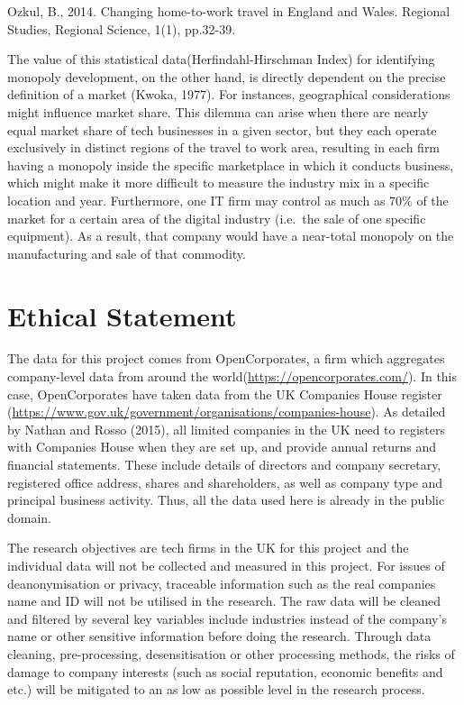 \documentclass[
  12pt,
  oneside]{book}
\begin{document}
Ozkul, B., 2014. Changing home-to-work travel in England and Wales. Regional Studies, Regional Science, 1(1), pp.32-39.

The value of this statistical data(Herfindahl-Hirschman Index) for identifying monopoly development, on the other hand, is directly dependent on the precise definition of a market (Kwoka, 1977). For instances, geographical considerations might influence market share. This dilemma can arise when there are nearly equal market share of tech businesses in a given sector, but they each operate exclusively in distinct regions of the travel to work area, resulting in each firm having a monopoly inside the specific marketplace in which it conducts business, which might make it more difficult to measure the industry mix in a specific location and year. Furthermore, one IT firm may control as much as 70\% of the market for a certain area of the digital industry (i.e.~the sale of one specific equipment). As a result, that company would have a near-total monopoly on the manufacturing and sale of that commodity.

\hypertarget{ethical-statement}{%
\section{Ethical Statement}\label{ethical-statement}}

The data for this project comes from OpenCorporates, a firm which aggregates company-level data from around the world(\url{https://opencorporates.com/}). In this case, OpenCorporates have taken data from the UK Companies House register (\url{https://www.gov.uk/government/organisations/companies-house}). As detailed by Nathan and Rosso (2015), all limited companies in the UK need to registers with Companies House when they are set up, and provide annual returns and financial statements. These include details of directors and company secretary, registered office address, shares and shareholders, as well as company type and principal business activity. Thus, all the data used here is already in the public domain.

The research objectives are tech firms in the UK for this project and the individual data will not be collected and measured in this project. For issues of deanonymisation or privacy, traceable information such as the real companies name and ID will not be utilised in the research. The raw data will be cleaned and filtered by several key variables include industries instead of the company's name or other sensitive information before doing the research. Through data cleaning, pre-processing, desensitisation or other processing methods, the risks of damage to company interests (such as social reputation, economic benefits and etc.) will be mitigated to an as low as possible level in the research process.
\end{document}
